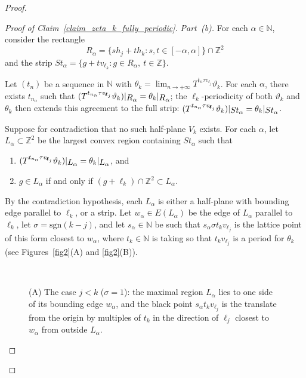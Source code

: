 \documentclass[12pt]{amsart}
\numberwithin{equation}{section}
\newcommand{\bb}[1]{\mathbb{#1}}
\newcommand{\sob}[1]{\ensuremath{{\mathbin |}\raise-.4ex\hbox{$#1$}}}
\begin{document}
\begin{proof}
\begin{proof}[Proof of Claim~\ref{claim_zeta_k_fully_periodic}]
\textit{Part~(b).}
For each $\alpha \in \bb{N}$, consider the rectangle $$R_{\alpha} = \{s h_{j}+t h_k : s,t \in [-\alpha,\alpha]\} \cap \bb{Z}^2$$ and the strip $St_{\alpha} = \{ g +t v_{\pmb{\ell}_k} : g \in R_{\alpha}, \ t \in \bb{Z}\}$. 

Let $ (t_n) $ be a sequence in $ \mathbb N $ with $\theta_k = \lim_{n \to +\infty} T^{t_n\tau v_{\pmb{\ell}_{j}}}\vartheta_k$. For each $\alpha$, there exists $t_{n_{\alpha}} $ such that $(T^{t_{n_{\alpha}}\tau v_{\pmb{\ell}_{j}}}\vartheta_k)\sob{R_{\alpha}} = \theta_k\sob{R_{\alpha}}$; the $\ell_k$-periodicity of both $\vartheta_k$ and $\theta_k$ then extends this agreement to the full strip: $(T^{t_{n_{\alpha}}\tau v_{\pmb{\ell}_{j}}}\vartheta_k)\sob{St_{\alpha}} = \theta_k\sob{St_{\alpha}}$. 

Suppose for contradiction that no such half-plane $V_k$ exists. For each $\alpha$, let $L_{\alpha} \subset \bb{Z}^2$ be the largest convex region containing $St_{\alpha}$ such that
\begin{enumerate}[label=(\roman*)]\setlength{\itemsep}{5pt}
	\item $(T^{t_{n_{\alpha}}\tau v_{\pmb{\ell}_{j}}}\vartheta_k)\sob{L_{\alpha}} = \theta_k\sob{L_{\alpha}}$, and
	\item $g \in L_{\alpha}$ if and only if $(g+\ell_k) \cap \bb{Z}^2 \subset L_{\alpha}$.
\end{enumerate}
By the contradiction hypothesis, each $L_{\alpha}$ is either a half-plane with bounding edge parallel to $\pmb{\ell}_k$, or a strip. Let $w_{\alpha} \in E(L_{\alpha})$ be the edge of $L_\alpha$ parallel to $\pmb{\ell}_k$, let $\sigma = \mathrm{sgn}(k-j)$, and let $s_{\alpha} \in \bb{N}$ be such that $s_{\alpha} \sigma t_kv_{\pmb{\ell}_{j}}$ is the lattice point of this form closest to $w_{\alpha}$, where $t_k \in \bb{N}$ is taking so that $t_kv_{\pmb{\ell}_{j}}$ is a period for $\theta_k$ (see Figures~\ref{fig2}{\color{red}(A)} and \ref{fig2}{\color{red}(B)}). 
\begin{figure}[ht]
	\begin{minipage}[t]{0.47\linewidth}
		\begin{center}
			\def\svgwidth{6.8cm}\\
		\end{center}
		\small{(A) The case $j < k$ ($\sigma = 1$): the maximal region $L_{\alpha}$ lies to one side of its bounding edge $ w_\alpha $, and the black point  $s_{\alpha} t_k v_{\pmb{\ell}_{j}}$ is the translate from the origin by multiples of $ t_k $ in the direction of $\pmb{\ell}_j$ closest to $w_{\alpha}$ from outside $L_\alpha$.}

\end{minipage}
\end{figure}
\end{proof}
\end{proof}
\end{document}

